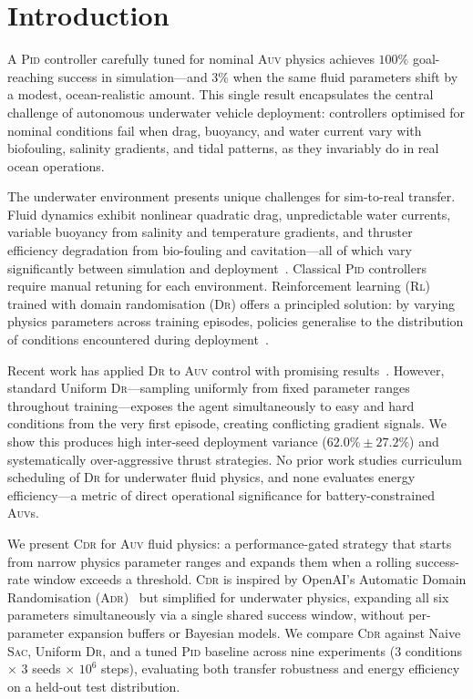\documentclass[letterpaper,10pt,journal]{IEEEtran}
\newcommand{\CDR}{\textsc{Cdr}\xspace}
\newcommand{\SAC}{\textsc{Sac}\xspace}
\newcommand{\PID}{\textsc{Pid}\xspace}
\newcommand{\AUV}{\textsc{Auv}\xspace}
\newcommand{\DR}{\textsc{Dr}\xspace}
\newcommand{\RL}{\textsc{Rl}\xspace}
\newcommand{\ADR}{\textsc{Adr}\xspace}
\begin{document}
\section{Introduction}
\label{sec:intro}

A \PID controller carefully tuned for nominal \AUV physics achieves
$100\%$ goal-reaching success in simulation---and $3\%$ when the same
fluid parameters shift by a modest, ocean-realistic amount.
This single result encapsulates the central challenge of autonomous
underwater vehicle deployment: controllers optimised for nominal conditions
fail when drag, buoyancy, and water current vary with biofouling,
salinity gradients, and tidal patterns, as they invariably do in real
ocean operations.

The underwater environment presents unique challenges for sim-to-real
transfer.
Fluid dynamics exhibit nonlinear quadratic drag, unpredictable water
currents, variable buoyancy from salinity and temperature gradients,
and thruster efficiency degradation from bio-fouling and
cavitation---all of which vary significantly between simulation and
deployment~\cite{fossen2011}.
Classical \PID controllers require manual retuning for each environment.
Reinforcement learning (\RL) trained with domain randomisation (\DR)
offers a principled solution: by varying physics parameters across
training episodes, policies generalise to the distribution of conditions
encountered during deployment~\cite{tobin2017,peng2018}.

Recent work has applied \DR to \AUV control with promising
results~\cite{arndt2024,chu2025,chaffre2025}.
However, standard Uniform \DR---sampling uniformly from fixed parameter
ranges throughout training---exposes the agent simultaneously to easy
and hard conditions from the very first episode, creating conflicting
gradient signals.
We show this produces high inter-seed deployment variance
($62.0\%\pm27.2\%$) and systematically over-aggressive thrust strategies.
No prior work studies curriculum scheduling of \DR for underwater
fluid physics, and none evaluates energy efficiency---a metric of direct
operational significance for battery-constrained \AUV{}s.

We present \CDR for \AUV fluid physics: a performance-gated strategy
that starts from narrow physics parameter ranges and expands them when
a rolling success-rate window exceeds a threshold.
\CDR is inspired by OpenAI's Automatic Domain Randomisation
(\ADR)~\cite{akkaya2019} but simplified for underwater physics,
expanding all six parameters simultaneously via a single shared success
window, without per-parameter expansion buffers or Bayesian models.
We compare \CDR against Naive \SAC, Uniform \DR, and a tuned \PID
baseline across nine experiments ($3$ conditions $\times$ $3$ seeds
$\times$ $10^6$ steps), evaluating both transfer robustness and
energy efficiency on a held-out test distribution.
\end{document}
